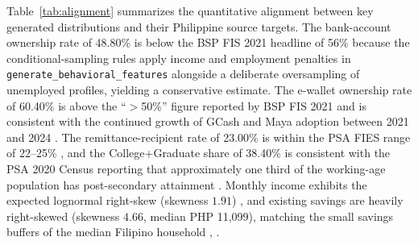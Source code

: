 \documentclass[journal]{./IEEE/IEEEtran}
\begin{document}
Table~\ref{tab:alignment} summarizes the quantitative alignment between key generated distributions and their Philippine source targets. The bank-account ownership rate of 48.80\% is below the BSP FIS 2021 headline of 56\% \cite{ref35} because the conditional-sampling rules apply income and employment penalties in \texttt{generate\_behavioral\_features} alongside a deliberate oversampling of unemployed profiles, yielding a conservative estimate. The e-wallet ownership rate of 60.40\% is above the ``$>$50\%'' figure reported by BSP FIS 2021 \cite{ref35} and is consistent with the continued growth of GCash and Maya adoption between 2021 and 2024 \cite{ref42}. The remittance-recipient rate of 23.00\% is within the PSA FIES range of 22--25\% \cite{ref40}, and the College+Graduate share of 38.40\% is consistent with the PSA 2020 Census reporting that approximately one third of the working-age population has post-secondary attainment \cite{ref39}. Monthly income exhibits the expected lognormal right-skew (skewness $1.91$) \cite{ref54}, and existing savings are heavily right-skewed (skewness $4.66$, median PHP 11{,}099), matching the small savings buffers of the median Filipino household \cite{ref35}, \cite{ref55}.
\end{document}
